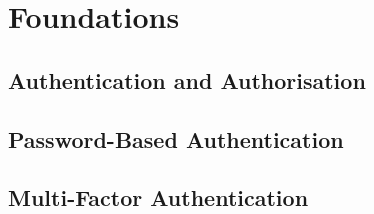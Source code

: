 
\section{Foundations}
\label{sec:foundations}

\subsection{Authentication and Authorisation}
\label{subsec:authn_authz}


\subsection{Password-Based Authentication}
\label{subsec:pw_based_authn}


\subsection{Multi-Factor Authentication}
\label{subsec:mfa}